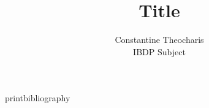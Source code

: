 

\title{Title}
\author{%
    Constantine Theocharis \\
    IBDP Subject
}


\maketitle



\csname printbibliography\endcsname

